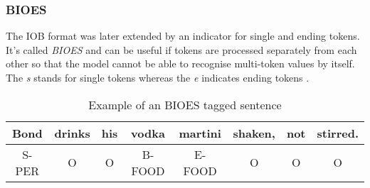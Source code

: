 \subsubsection{BIOES}

The IOB format was later extended by an indicator for single and ending tokens. It's called \emph{BIOES} and can be useful if tokens are processed separately from each other so that the model cannot be able to recognise multi-token values by itself. The \emph{s} stands for single tokens whereas the \emph{e} indicates ending tokens \cite{hofer18}.

\begin{table}[h!]
    \centering
    \begin{tabular}{|c|c|c|c|c|c|c|c|}
        \hline
        Bond & drinks & his & vodka & martini & shaken, & not & stirred. \\
        \hline
        S-PER & O & O & B-FOOD & E-FOOD & O & O & O \\
        \hline
    \end{tabular}
    \caption{Example of an BIOES tagged sentence}
    \label{tbl:bioes-labelling}
\end{table}
